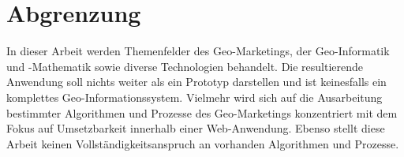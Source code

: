 \section{Abgrenzung}
In dieser Arbeit werden Themenfelder des Geo-Marketings, der Geo-Informatik und -Mathematik sowie diverse Technologien behandelt. 
Die resultierende Anwendung soll nichts weiter als ein Prototyp darstellen und ist keinesfalls ein komplettes Geo-Informationssystem. Vielmehr wird sich auf die Ausarbeitung bestimmter Algorithmen und Prozesse des Geo-Marketings konzentriert mit dem Fokus auf Umsetzbarkeit innerhalb einer Web-Anwendung. 
Ebenso stellt diese Arbeit keinen Vollständigkeitsanspruch an vorhanden Algorithmen und Prozesse. 